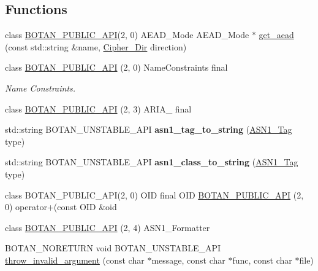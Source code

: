 \subsection*{Functions}
\begin{DoxyCompactItemize}
\item 
class \hyperlink{namespace_botan_a6b9388030d872e586a4655b776ac9501}{B\+O\+T\+A\+N\+\_\+\+P\+U\+B\+L\+I\+C\+\_\+\+A\+PI}(2, 0) A\+E\+A\+D\+\_\+\+Mode A\+E\+A\+D\+\_\+\+Mode $\ast$ \hyperlink{namespace_botan_a22646ab3e050b0bf8f3ec55184c467c6}{get\+\_\+aead} (const std\+::string \&name, \hyperlink{namespace_botan_a8d9547a8fb3e868810b169b20ac389ee}{Cipher\+\_\+\+Dir} direction)
\item 
class \hyperlink{namespace_botan_a6b9388030d872e586a4655b776ac9501}{B\+O\+T\+A\+N\+\_\+\+P\+U\+B\+L\+I\+C\+\_\+\+A\+PI} (2, 0) Name\+Constraints final
\begin{DoxyCompactList}\small\item\em Name Constraints. \end{DoxyCompactList}\item 
class \hyperlink{namespace_botan_afd1e3579e181524cb922e1d233ffbea9}{B\+O\+T\+A\+N\+\_\+\+P\+U\+B\+L\+I\+C\+\_\+\+A\+PI} (2, 3) A\+R\+I\+A\+\_ final
\item 
\mbox{\label{namespace_botan_af5d65b1f703d9c29527586b69bac0021}} 
std\+::string B\+O\+T\+A\+N\+\_\+\+U\+N\+S\+T\+A\+B\+L\+E\+\_\+\+A\+PI {\bfseries asn1\+\_\+tag\+\_\+to\+\_\+string} (\hyperlink{namespace_botan_acc1ab433420bdddbcfe52dbbd94e8576}{A\+S\+N1\+\_\+\+Tag} type)
\item 
\mbox{\label{namespace_botan_ae3fd3b8984ac014a97d4c7e88547f35c}} 
std\+::string B\+O\+T\+A\+N\+\_\+\+U\+N\+S\+T\+A\+B\+L\+E\+\_\+\+A\+PI {\bfseries asn1\+\_\+class\+\_\+to\+\_\+string} (\hyperlink{namespace_botan_acc1ab433420bdddbcfe52dbbd94e8576}{A\+S\+N1\+\_\+\+Tag} type)
\item 
class B\+O\+T\+A\+N\+\_\+\+P\+U\+B\+L\+I\+C\+\_\+\+A\+PI(2, 0) O\+ID final O\+ID \hyperlink{namespace_botan_aa0df5a86f85160d4d4b3cfdb3fe37b55}{B\+O\+T\+A\+N\+\_\+\+P\+U\+B\+L\+I\+C\+\_\+\+A\+PI} (2, 0) operator+(const O\+ID \&oid
\item 
class \hyperlink{namespace_botan_a306d82593a051b515b926e213e8040f2}{B\+O\+T\+A\+N\+\_\+\+P\+U\+B\+L\+I\+C\+\_\+\+A\+PI} (2, 4) A\+S\+N1\+\_\+\+Formatter
\item 
B\+O\+T\+A\+N\+\_\+\+N\+O\+R\+E\+T\+U\+RN void B\+O\+T\+A\+N\+\_\+\+U\+N\+S\+T\+A\+B\+L\+E\+\_\+\+A\+PI \hyperlink{namespace_botan_aaf096546028928a2d760aa504a9a2a74}{throw\+\_\+invalid\+\_\+argument} (const char $\ast$message, const char $\ast$func, const char $\ast$file)

\end{DoxyCompactItemize}
